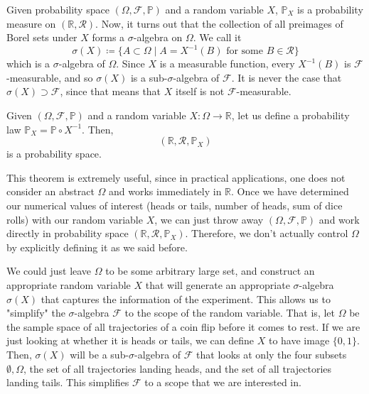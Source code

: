\documentclass{article}
\begin{document}
    \begin{theorem}
      Given probability space $(\Omega, \mathcal{F}, \mathbb{P})$ and a random variable $X$, $\mathbb{P}_X$ is a probability measure on $(\mathbb{R}, \mathcal{R})$. Now, it turns out that the collection of all preimages of Borel sets under $X$ forms a $\sigma$-algebra on $\Omega$. We call it 
      \begin{equation}
        \sigma(X) \coloneqq \big\{ A \subset \Omega \mid A = X^{-1}(B) \text{ for some } B \in \mathcal{R} \big\}
      \end{equation}
      which is a $\sigma$-algebra of $\Omega$. Since $X$ is a measurable function, every $X^{-1}(B)$ is $\mathcal{F}$-measurable, and so $\sigma(X)$ is a sub-$\sigma$-algebra of $\mathcal{F}$. It is never the case that $\sigma(X) \supset \mathcal{F}$, since that means that $X$ itself is not $\mathcal{F}$-measurable. 
    \end{theorem}

    \begin{theorem}
      Given $(\Omega, \mathcal{F}, \mathbb{P})$ and a random variable $X: \Omega \rightarrow \mathbb{R}$, let us define a probability law $\mathbb{P}_X = \mathbb{P} \circ X^{-1}$. Then, 
      \begin{equation}
        (\mathbb{R}, \mathcal{R}, \mathbb{P}_X)
      \end{equation}
      is a probability space. 
    \end{theorem}

    This theorem is extremely useful, since in practical applications, one does not consider an abstract $\Omega$ and works immediately in $\mathbb{R}$. Once we have determined our numerical values of interest (heads or tails, number of heads, sum of dice rolls) with our random variable $X$, we can just throw away $(\Omega, \mathcal{F}, \mathbb{P})$ and work directly in probability space $(\mathbb{R}, \mathcal{R}, \mathbb{P}_X)$. Therefore, we don't actually control $\Omega$ by explicitly defining it as we said before. 

    We could just leave $\Omega$ to be some arbitrary large set, and construct an appropriate random variable $X$ that will generate an appropriate $\sigma$-algebra $\sigma(X)$ that captures the information of the experiment. This allows us to "simplify" the $\sigma$-algebra $\mathcal{F}$ to the scope of the random variable. That is, let $\Omega$ be the sample space of all trajectories of a coin flip before it comes to rest. If we are just looking at whether it is heads or tails, we can define $X$ to have image $\{0, 1\}$. Then, $\sigma(X)$ will be a sub-$\sigma$-algebra of $\mathcal{F}$ that looks at only the four subsets $\emptyset, \Omega$, the set of all trajectories landing heads, and the set of all trajectories landing tails. This simplifies $\mathcal{F}$ to a scope that we are interested in. 
\end{document}
